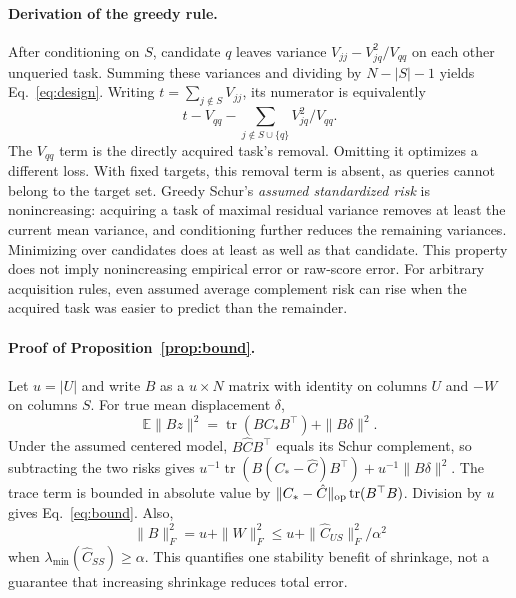 \documentclass{article}
\newcommand{\tr}{\operatorname{tr}}
\newcommand{\E}{\mathbb{E}}
\begin{document}
\paragraph{Derivation of the greedy rule.}
After conditioning on $S$, candidate $q$ leaves variance $V_{jj}-V_{jq}^2/V_{qq}$ on each other unqueried task. Summing these variances and dividing by $N-|S|-1$ yields Eq.~\eqref{eq:design}. Writing $t=\sum_{j\notin S}V_{jj}$, its numerator is equivalently
\begin{equation}
 t-V_{qq}-\sum_{j\notin S\cup\{q\}}V_{jq}^2/V_{qq}.
 \label{eq:removal}
\end{equation}
The $V_{qq}$ term is the directly acquired task's removal. Omitting it optimizes a different loss. With fixed targets, this removal term is absent, as queries cannot belong to the target set. Greedy Schur's \emph{assumed standardized risk} is nonincreasing: acquiring a task of maximal residual variance removes at least the current mean variance, and conditioning further reduces the remaining variances. Minimizing over candidates does at least as well as that candidate. This property does not imply nonincreasing empirical error or raw-score error. For arbitrary acquisition rules, even assumed average complement risk can rise when the acquired task was easier to predict than the remainder.

\paragraph{Proof of Proposition~\ref{prop:bound}.}
Let $u=|U|$ and write $B$ as a $u\times N$ matrix with identity on columns $U$ and $-W$ on columns $S$. For true mean displacement $\delta$,
\begin{equation}
 \E\|Bz\|^2=\tr(BC_*B^\top)+\|B\delta\|^2.
 \label{eq:quadratic}
\end{equation}
Under the assumed centered model, $B\hat C B^\top$ equals its Schur complement, so subtracting the two risks gives $u^{-1}\tr(B(C_*-\hat C)B^\top)+u^{-1}\|B\delta\|^2$. The trace term is bounded in absolute value by $\|C_*-\hat C\|_{\rm op}\tr(B^\top B)$. Division by $u$ gives Eq.~\eqref{eq:bound}. Also,
\begin{equation}
 \|B\|_F^2=u+\|W\|_F^2\leq u+\|\hat C_{US}\|_F^2/\alpha^2
 \label{eq:conditioningbound}
\end{equation}
when $\lambda_{\min}(\hat C_{SS})\geq\alpha$. This quantifies one stability benefit of shrinkage, not a guarantee that increasing shrinkage reduces total error.
\end{document}
